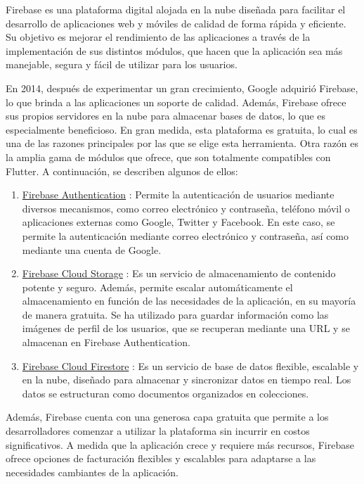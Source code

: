 \documentclass{article}
\begin{document}
Firebase \cite{Firebase} es una plataforma digital alojada en la nube diseñada para facilitar el desarrollo de aplicaciones web y móviles de calidad de forma rápida y eficiente. Su objetivo es mejorar el rendimiento de las aplicaciones a través de la implementación de sus distintos módulos, que hacen que la aplicación sea más manejable, segura y fácil de utilizar para los usuarios.

En 2014, después de experimentar un gran crecimiento, Google adquirió Firebase, lo que brinda a las aplicaciones un soporte de calidad. Además, Firebase ofrece sus propios servidores en la nube para almacenar bases de datos, lo que es especialmente beneficioso. En gran medida, esta plataforma es gratuita, lo cual es una de las razones principales por las que se elige esta herramienta. Otra razón es la amplia gama de módulos que ofrece, que son totalmente compatibles con Flutter. A continuación, se describen algunos de ellos:

\begin{enumerate}
    \item \underline{Firebase Authentication} \cite{Firebase 1}: Permite la autenticación de usuarios mediante diversos mecanismos, como correo electrónico y contraseña, teléfono móvil o aplicaciones externas como Google, Twitter y Facebook. En este caso, se permite la autenticación mediante correo electrónico y contraseña, así como mediante una cuenta de Google.
    \item \underline{Firebase Cloud Storage} \cite{Firebase 2}: Es un servicio de almacenamiento de contenido potente y seguro. Además, permite escalar automáticamente el almacenamiento en función de las necesidades de la aplicación, en su mayoría de manera gratuita. Se ha utilizado para guardar información como las imágenes de perfil de los usuarios, que se recuperan mediante una URL y se almacenan en Firebase Authentication.
    \item \underline{Firebase Cloud Firestore} \cite{Firebase 3}: Es un servicio de base de datos flexible, escalable y en la nube, diseñado para almacenar y sincronizar datos en tiempo real. Los datos se estructuran como documentos organizados en colecciones.
\end{enumerate}

Además, Firebase cuenta con una generosa capa gratuita que permite a los desarrolladores comenzar a utilizar la plataforma sin incurrir en costos significativos. A medida que la aplicación crece y requiere más recursos, Firebase ofrece opciones de facturación flexibles y escalables para adaptarse a las necesidades cambiantes de la aplicación.
\end{document}
